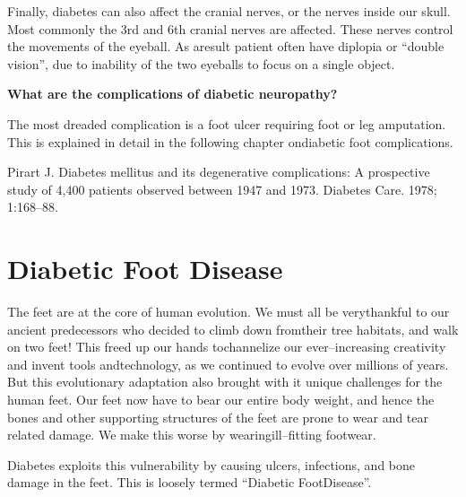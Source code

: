 Finally, diabetes can also affect the cranial nerves, or the nerves inside our skull. Most commonly the 3rd and 6th cranial nerves are affected. These nerves control the movements of the eyeball. As a\break result patient often have diplopia or “double vision”, due to inability of the two eyeballs to focus on a single object.

\noindent\textbf{What are the complications of diabetic neuropathy?}

The most dreaded complication is a foot ulcer requiring foot or leg amputation. This is explained in detail in the following chapter on\break diabetic foot complications.

\begin{thebibliography}{99}
 Pirart J. Diabetes mellitus and its degenerative complications: A prospective study of 4,400 patients observed between 1947 and 1973. Diabetes Care. 1978; 1:168–88.
\end{thebibliography}

\newpage


\chapter{Diabetic Foot Disease}\label{chap17}

\vspace{-\topsep}
The feet are at the core of human evolution. We must all be very\break thankful to our ancient predecessors who decided to climb down from\break their tree habitats, and walk on two feet! This freed up our hands to\break channelize our ever–increasing creativity and invent tools and\break technology, as we continued to evolve over millions of years. But this evolutionary adaptation also brought with it unique challenges for the human feet. Our feet now have to bear our entire body weight, and hence the bones and other supporting structures of the feet are prone to wear and tear related damage. We make this worse by wearing\break ill–fitting footwear.

Diabetes exploits this vulnerability by causing ulcers, infections, and bone damage in the feet. This is loosely termed “Diabetic Foot\break Disease”.

